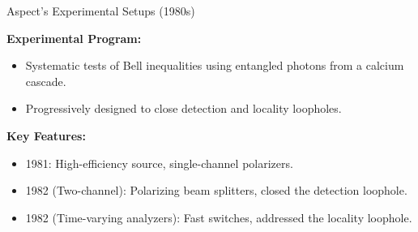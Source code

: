 \begin{frame}{Aspect's Experimental Setups (1980s)}

\begin{minipage}{0.58\textwidth}
\vspace{-2.cm}
\textbf{Experimental Program:}
\begin{itemize}
  \item Systematic tests of Bell inequalities using entangled photons from a calcium cascade.  
  \item Progressively designed to close detection and locality loopholes.  
\end{itemize}

\pause

\textbf{Key Features:}
\begin{itemize}
  \item 1981: High-efficiency source, single-channel polarizers.  
  \item 1982 (Two-channel): Polarizing beam splitters, closed the detection loophole.  
  \item 1982 (Time-varying analyzers): Fast switches, addressed the locality loophole.  
\end{itemize}

\vspace{-0.8cm}


\end{minipage}
\end{frame}
